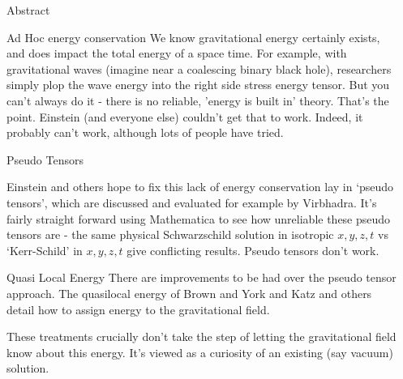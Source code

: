 \documentclass[final]{beamer}
\newlength{\sepwidth}
\newlength{\colwidth}
\newcommand{\separatorcolumn}{\begin{column}{\sepwidth}\end{column}}
\begin{document}
\begin{frame}[t]
\begin{columns}[t]
\begin{column}{\colwidth}
\begin{block}{Abstract}
  \end{block}

  \begin{block}{Ad Hoc energy conservation}
  	We know gravitational energy certainly exists, and does impact the total energy of a space time. For example, with gravitational waves (imagine near a coalescing binary black hole), researchers simply plop the wave energy into the right side stress energy tensor. But you can't always do it - there is no reliable, 'energy is built in' theory. That's the point. Einstein (and everyone else) couldn't get that to work. Indeed, it probably can't work, although lots of people have tried.

  \end{block}

  \begin{block}{Pseudo Tensors}


Einstein and others hope to fix this lack of energy conservation lay in `pseudo tensors', which are discussed and evaluated for example by Virbhadra\cite{virbhadraEnergyDistributionKerrNewman1990}\cite{virbhadraEnergyMomentumVaidya1992}. It's fairly straight forward using Mathematica to see how unreliable these pseudo tensors are - the same physical Schwarzschild solution in isotropic $x,y,z,t$ vs `Kerr-Schild' in $x,y,z,t$ give conflicting results\cite{RzeroMathematicaSchwarschildpseudoChecknb}. Pseudo tensors don't work.
  \end{block}

  \begin{block}{Quasi Local Energy}
There are improvements to be had over the pseudo tensor approach. The quasilocal energy of Brown and York\cite{Brown1993} and Katz\cite{Katz2005} and others \cite{haroNoethersTheoremsEnergy2021}\cite{lyndenbell1985}\cite{changPseudotensorsQuasilocalEnergymomentum1999} detail how to assign energy to the gravitational field. 

These treatments crucially don't take the step of letting the gravitational field know about this energy. It's viewed as a curiosity of an existing (say vacuum) solution. 
  \end{block}


\end{column}

\separatorcolumn



\end{columns}
\end{frame}
\end{document}

